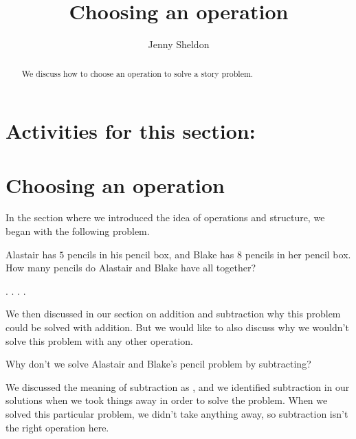 \documentclass{ximera}
\title{Choosing an operation}
\author{Jenny Sheldon}
\begin{document}
\begin{abstract}
We discuss how to choose an operation to solve a story problem.
\end{abstract}
\maketitle


\section{Activities for this section:} 

\section{Choosing an operation}

In the section where we introduced the idea of operations and structure, we began with the following problem. 

\begin{question}
Alastair has $5$ pencils in his pencil box, and Blake has $8$ pencils in her pencil box. How many pencils do Alastair and Blake have all together?

\begin{multipleChoice}
.
.
.
.
\end{multipleChoice}
\end{question}

We then discussed in our section on addition and subtraction why this problem could be solved with addition. But we would like to also discuss why we wouldn't solve this problem with any other operation.

\begin{question}
Why don't we solve Alastair and Blake's pencil problem by subtracting?

\begin{explanation}
We discussed the meaning of subtraction as , and we identified subtraction in our solutions when we took things away in order to solve the problem. When we solved this particular problem, we didn't take anything away, so subtraction isn't the right operation here.
\end{explanation}
\end{question}
\end{document}
